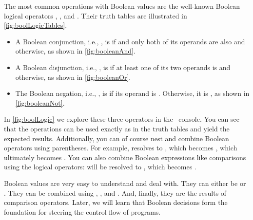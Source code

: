 %
The most common operations with Boolean values are the well-known Boolean logical operators , , and .
Their truth tables are illustrated in \cref{fig:boolLogicTables}.%
%
\begin{itemize}%
%
\item A Boolean conjunction, i.e., , is  if and only both of its operands are also  and  otherwise, as shown in \cref{fig:booleanAnd}.%
%
\item A Boolean disjunction, i.e., , is  if at least one of its two operands is  and  otherwise, as shown in \cref{fig:booleanOr}.%
%
\item The Boolean negation, i.e., , is  if its operand is . %
Otherwise, it is , as shown in \cref{fig:booleanNot}.%
%
\end{itemize}%
%
\begin{sloppypar}%
In \cref{fig:boolLogic} we explore these three operators in the \python\ console.
You can see that the operations can be used exactly as in the truth tables and yield the expected results.
Additionally, you can of course nest and combine Boolean operators using parentheses\pythonIdx{(}\pythonIdx{)}.
For example,  resolves to , which becomes , which ultimately becomes .
You can also combine Boolean expressions like comparisons using the logical operators:
 will be resolved to , which becomes .%
\end{sloppypar}%
%
\endhsection%
%
%
%
Boolean values are very easy to understand and deal with.
They can either be  or .
They can be combined using , , and .
And, finally, they are the results of comparison operators.
Later, we will learn that Boolean decisions form the foundation for steering the control flow of programs.%
%
\endhsection%
\FloatBarrier%
\endhsection%
%

